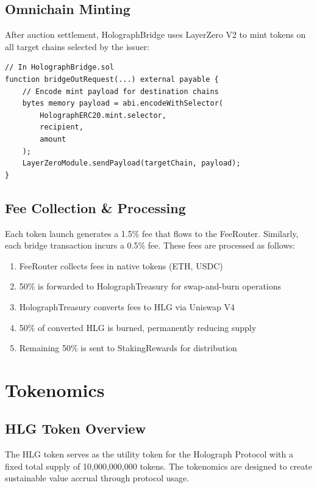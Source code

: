 \documentclass[10pt,a4paper,twocolumn]{article}
\begin{document}
\subsection{Omnichain Minting}
After auction settlement, HolographBridge uses LayerZero V2 to mint tokens on all target chains selected by the issuer:

\begin{lstlisting}[language=Solidity, caption=Omnichain Minting Code]
// In HolographBridge.sol
function bridgeOutRequest(...) external payable {
    // Encode mint payload for destination chains
    bytes memory payload = abi.encodeWithSelector(
        HolographERC20.mint.selector,
        recipient,
        amount
    );
    LayerZeroModule.sendPayload(targetChain, payload);
}
\end{lstlisting}

\subsection{Fee Collection \& Processing}
Each token launch generates a 1.5\% fee that flows to the FeeRouter. Similarly, each bridge transaction incurs a 0.5\% fee. These fees are processed as follows:
\begin{enumerate}
  \item FeeRouter collects fees in native tokens (ETH, USDC)
  \item 50\% is forwarded to HolographTreasury for swap-and-burn operations
  \item HolographTreasury converts fees to HLG via Uniswap V4
  \item 50\% of converted HLG is burned, permanently reducing supply
  \item Remaining 50\% is sent to StakingRewards for distribution
\end{enumerate}

\section{Tokenomics}

\subsection{HLG Token Overview}
The HLG token serves as the utility token for the Holograph Protocol with a fixed total supply of 10,000,000,000 tokens. The tokenomics are designed to create sustainable value accrual through protocol usage.
\end{document}
